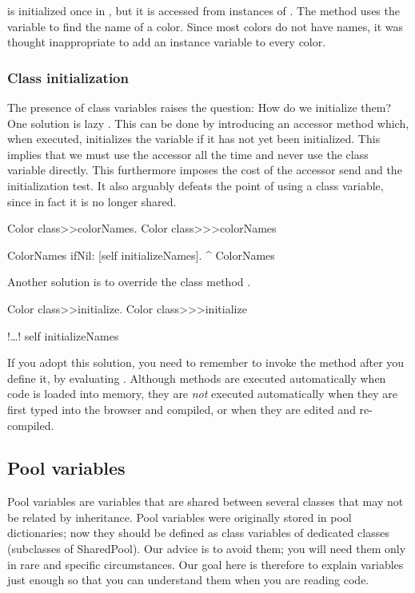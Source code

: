 \documentclass[a4paper,10pt,twoside]{book}
\begin{document}
 is initialized once in , but it is accessed from instances of .
The method  uses the variable to find the name of a color.
Since most colors do not have names, it was thought inappropriate to add an instance variable  to every color.

\subsubsection{Class initialization}

The presence of class variables raises the question:
How do we initialize them?
One solution is lazy .
This can be done by introducing an accessor method which, when executed, initializes the variable if it has not yet been initialized.
This implies that we must use the accessor all the time and never use the class variable directly.
This furthermore imposes the cost of the accessor send and the initialization test.
It also arguably defeats the point of using a class variable, since in fact it is no longer shared.

\begin{method}[colorclasscolornames]{Color class>>colorNames.}
Color class>>>colorNames

	ColorNames ifNil: [self initializeNames].
	^ ColorNames
\end{method}

Another solution is to override the class method .

\begin{method}[colorclassinit]{Color class>>initialize.}
Color class>>>initialize

	!\ldots!
	self initializeNames
\end{method}

\noindent
If you adopt this solution, you need to remember to invoke the  method after you define it, \eg by evaluating .
Although   methods are executed automatically when code is loaded into memory, they are \emph{not} executed automatically when they are first typed into the browser and compiled, or when they are edited and re-compiled.

\subsection{Pool variables}
Pool variables are variables that are shared between several classes that may not be related by inheritance.
Pool variables were originally stored in pool dictionaries; now they should be defined as class variables of dedicated classes (subclasses of SharedPool).
Our advice is to avoid them; you will need them only in rare and specific circumstances.
Our goal here is therefore to explain  variables just enough so that you can understand them when you are reading code.
\end{document}

